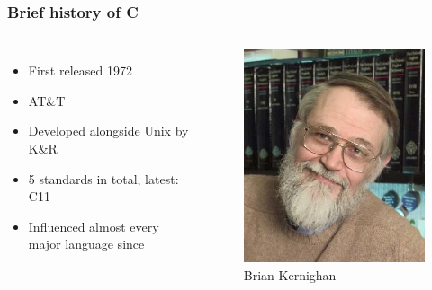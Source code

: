 \documentclass{beamer}
\begin{document}
\begin{frame}
    \frametitle{Brief history of C}
    \begin{columns}

        \begin{itemize}[<+->]
            \item First released 1972
            \item AT\&T
            \item Developed alongside Unix by K\&R
            \item 5 standards in total, latest: C11
            \item Influenced almost every major language since
        \end{itemize}


        \begin{figure}
            \centering
            \includegraphics[width=\textwidth]{briankernighan.jpg}
            \caption*{Brian Kernighan}
            \label{fig:kern}
        \end{figure}


\end{columns}
\end{frame}
\end{document}
